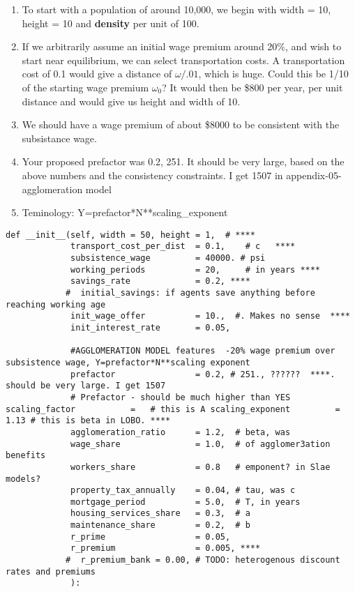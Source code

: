 \begin{enumerate}
\item To start with a population of around 10,000, we begin with width = 10, height = 10 and \textbf{density} per unit of 100. 

\item If we arbitrarily assume an initial wage premium around 20\%, and wish to start near equilibrium, %
we can select transportation costs. A transportation cost of 0.1  would give a distance of $\omega/.01$, which is huge. Could this be 1/10 of the starting wage premium $\omega_0$? It would then be \$800 per year, per unit distance and would give us height and width of 10. 
\item We should have a wage premium of about \$8000 to be consistent with the subsistance wage. %

\item Your proposed prefactor was 0.2,  251. It should be very large, based on the above numbers and the consistency constraints. I get 1507 in appendix-05-agglomeration model

\item Teminology: Y=prefactor*N**scaling\_exponent

\end{enumerate}

\begin{lstlisting}
def __init__(self, width = 50, height = 1,  # ****
             transport_cost_per_dist  = 0.1,    # c   ****
             subsistence_wage         = 40000. # psi
             working_periods          = 20,     # in years ****
             savings_rate             = 0.2, ****
            #  initial_savings: if agents save anything before reaching working age
             init_wage_offer          = 10.,  #. Makes no sense  ****
             init_interest_rate       = 0.05,

             #AGGLOMERATION MODEL features  -20% wage premium over subsistence wage, Y=prefactor*N**scaling exponent
             prefactor                = 0.2, # 251., ??????  ****. should be very large. I get 1507 
             # Prefactor - should be much higher than YES scaling_factor           =   # this is A scaling_exponent         =  1.13 # this is beta in LOBO. ****
             agglomeration_ratio      = 1.2,  # beta, was 
             wage_share               = 1.0,  # of agglomer3ation benefits
             workers_share            = 0.8   # emponent? in Slae models?
             property_tax_annually    = 0.04, # tau, was c
             mortgage_period          = 5.0,  # T, in years
             housing_services_share   = 0.3,  # a
             maintenance_share        = 0.2,  # b
             r_prime                  = 0.05,
             r_premium                = 0.005, ****
            #  r_premium_bank = 0.00, # TODO: heterogenous discount rates and premiums
             ):
\end{lstlisting}

